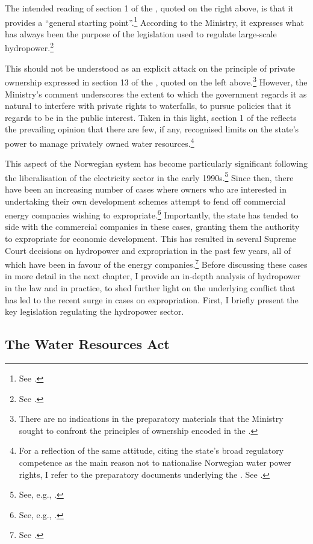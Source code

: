 The intended reading of section 1 of the \cite{ica17}, quoted on the right above, is that it provides a ``general starting point''.\footnote{See \cite[72]{otprp61}.} According to the Ministry, it expresses what has always been the purpose of the legislation used to regulate large-scale hydropower.\footnote{See \cite[72]{otprp61}.} 

This should not be understood as an explicit attack on the principle of private ownership expressed in section 13 of the \cite{wra00}, quoted on the left above.\footnote{There are no indications in the preparatory materials that the Ministry sought to confront the principles of ownership encoded in the \cite{wra00}.} However, the Ministry's comment underscores the extent to which the government regards it as natural to interfere with private rights to waterfalls, to pursue policies that it regards to be in the public interest. Taken in this light, section 1 of the \cite{ica17} reflects the prevailing opinion that there are few, if any, recognised limits on the state's power to manage privately owned water resources.\footnote{For a reflection of the same attitude, citing the state's broad regulatory competence as the main reason not to nationalise Norwegian water power rights, I refer to the preparatory documents underlying the \cite{wra00}. See \cite[152-153]{nou94}.}

This aspect of the Norwegian system has become particularly significant following the liberalisation of the electricity sector in the early 1990s.\footnote{See, e.g., \cite{larsen06}.} Since then, there have been an increasing number of cases where owners who are interested in undertaking their own development schemes attempt to fend off commercial energy companies wishing to expropriate.\footnote{See, e.g., \cite{sofienlund07}.} Importantly, the state has tended to side with the commercial companies in these cases, granting them the authority to expropriate for economic development. This has resulted in several Supreme Court decisions on hydropower and expropriation in the past few years, all of which have been in favour of the energy companies.\footnote{See  \cite{uleberg08,jorpeland11,klovtveit11,otra13}.} Before discussing these cases in more detail in the next chapter, I provide an in-depth analysis of hydropower in the law and in practice, to shed further light on the underlying conflict that has led to the recent surge in cases on expropriation. First, I briefly present the key legislation regulating the hydropower sector.

\subsection{The Water Resources Act}\label{sec:wra00}

